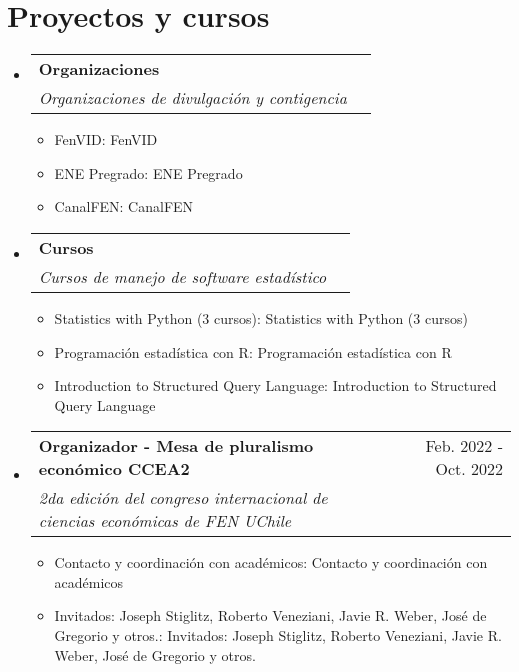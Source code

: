 \documentclass[letterpaper,12pt]{article}
\makeatletter
\def \ifempty#1{\def\temp{#1} \ifx\temp\empty }
\newcommand{\resumeItem}[2]{
  \item\small{
  	\ifempty{#1}#2\else\textbf{#1}{: #2 \vspace{-2pt}}\fi
  }
}
\newcommand{\resumeSubheading}[4]{
  \vspace{-1pt}\item
    \begin{tabular*}{0.97\textwidth}{l@{\extracolsep{\fill}}r}
      \textbf{#1} & #2 \\
      \textit{\small#3} & \textit{\small #4} \\
    \end{tabular*}\vspace{-5pt}
}
\newcommand{\resumeSubHeadingListStart}{\begin{itemize}[leftmargin=*]}
\newcommand{\resumeSubHeadingListEnd}{\end{itemize}}
\newcommand{\resumeItemListStart}{\begin{itemize}}
\newcommand{\resumeItemListEnd}{\end{itemize}\vspace{-5pt}}
\makeatother
\begin{document}
\section{Proyectos y cursos}
  \resumeSubHeadingListStart
  \resumeSubheading
      {Organizaciones}{}
      {Organizaciones de divulgación y contigencia}{}
      \resumeItemListStart
        \resumeItem{}
            {FenVID}
        \resumeItem{}
            {ENE Pregrado}
        \resumeItem{}
            {CanalFEN}
        \resumeItemListEnd
  \resumeSubheading
      {Cursos}{}
      {Cursos de manejo de software estadístico}{}
      \resumeItemListStart
        \resumeItem{}
            {Statistics with Python (3 cursos)}
        \resumeItem{}
            {Programación estadística con R}
        \resumeItem{}
            {Introduction to Structured Query Language}
        \resumeItemListEnd     
        \resumeSubheading
      {Organizador - Mesa de pluralismo económico CCEA2}{Feb. 2022 - Oct. 2022}{2da edición del congreso internacional de ciencias económicas de FEN UChile}{}
      \resumeItemListStart
        \resumeItem{}
            {Contacto y coordinación con académicos}
        \resumeItem{}
            {Invitados: Joseph Stiglitz, Roberto Veneziani, Javie R. Weber, José de Gregorio y otros.}
        \resumeItemListEnd
      
  \resumeSubHeadingListEnd



\end{document}
